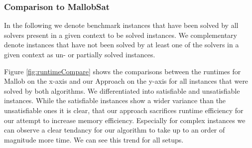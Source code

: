 \documentclass[12pt,a4paper,twoside]{scrartcl}
\numberwithin{equation}{section}
\begin{document}
\subsubsection{Comparison to MallobSat}

In the following we denote benchmark instances that have been solved by all solvers present in a given context to be solved instances. We complementary denote instances that have not been solved by at least one of the solvers in a given context as un- or partially solved instances.

Figure \ref{fig:runtimeCompare} shows the comparisons between the runtimes for Mallob on the x-axis and our Approach on the y-axis for all instances that were solved by both algorithms. We differentiated into satisfiable and unsatisfiable instances. While the satisfiable instances show a wider variance than the unsatisfiable ones it is clear, that our approach sacrifices runtime efficiency for our attempt to increase memory efficiency. Especially for complex instances we can observe a clear tendancy for our algorithm to take up to an order of magnitude more time. We can see this trend for all setups.
\end{document}

